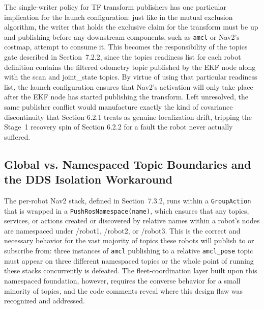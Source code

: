 The single-writer policy for TF transform publishers has one particular implication for the launch configuration: just like in the mutual exclusion algorithm, the writer that holds the exclusive claim for the transform must be up and publishing before any downstream components, such as \texttt{amcl} or Nav2's costmap, attempt to consume it. This becomes the responsibility of the topics gate described in Section~7.2.2, since the topics readiness list for each robot definition contains the filtered odometry topic published by the EKF node along with the scan and joint\_state topics. By virtue of using that particular readiness list, the launch configuration ensures that Nav2's activation will only take place after the EKF node has started publishing the transform. Left unresolved, the same publisher conflict would manufacture exactly the kind of covariance discontinuity that Section 6.2.1 treats as genuine localization drift, tripping the Stage~1 recovery spin of Section 6.2.2 for a fault the robot never actually suffered.

\subsection{Global vs. Namespaced Topic Boundaries and the DDS Isolation Workaround}

The per-robot Nav2 stack, defined in Section~7.3.2, runs within a \texttt{GroupAction} that is wrapped in a \texttt{PushRosNamespace(name)}, which ensures that any topics, services, or actions created or discovered by relative names within a robot's nodes are namespaced under /robot1, /robot2, or /robot3. This is the correct and necessary behavior for the vast majority of topics these robots will publish to or subscribe from: three instances of \texttt{amcl} publishing to a relative \texttt{amcl\_pose} topic must appear on three different namespaced topics or the whole point of running these stacks concurrently is defeated. The fleet-coordination layer built upon this namespaced foundation, however, requires the converse behavior for a small minority of topics, and the code comments reveal where this design flaw was recognized and addressed.

